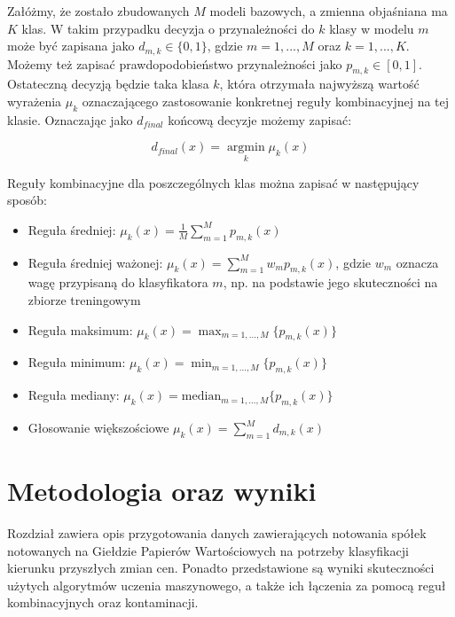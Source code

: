 \documentclass[12pt,a4paper,twoside,openany]{book}
\DeclareMathOperator*{\argmin}{argmin}
\newcommand*{\argminl}{\argmin\limits}
\begin{document}
Załóżmy, że zostało zbudowanych $M$ modeli bazowych, a zmienna objaśniana ma $K$ klas. W takim przypadku decyzja o przynależności do $k$ klasy w modelu $m$ może być zapisana jako $d_{m, k} \in \{0, 1\}$, gdzie $m = 1, ..., M$ oraz $k = 1, ..., K$. Możemy też zapisać prawdopodobieństwo przynależności jako $p_{m, k} \in {[0,1]}$. Ostateczną decyzją będzie taka klasa $k$, która otrzymała najwyższą wartość wyrażenia $\mu_k$ oznaczającego zastosowanie konkretnej reguły kombinacyjnej na tej klasie. Oznaczając jako $d_{final}$ końcową decyzje możemy zapisać:

\begin{equation} \label{wzor14}
d_{final}(x) = \argminl_{k}\mu_k(x)
\end{equation}

Reguły kombinacyjne dla poszczególnych klas można zapisać w następujący sposób:
\begin{itemize}
\item Reguła średniej: $\mu_k(x) = \frac{1}{M}\sum_{m = 1}^{M}p_{m, k}(x)$
\item Reguła średniej ważonej: $\mu_k(x) = \sum_{m = 1}^{M}w_mp_{m, k}(x)$, gdzie $w_m$ oznacza wagę przypisaną do klasyfikatora $m$, np. na podstawie jego skuteczności na zbiorze treningowym
\item Reguła maksimum: $\mu_k(x) = \max_{m = 1, ..., M}\{p_{m, k}(x)\}$
\item Reguła minimum: $\mu_k(x) = \min_{m = 1, ..., M}\{p_{m, k}(x)\}$
\item Reguła mediany: $\mu_k(x) = \mathrm{median}_{m = 1, ..., M}\{p_{m, k}(x)\}$
\item Głosowanie większościowe $\mu_k(x) = \sum_{m = 1}^{M} d_{m, k}(x)$
\end{itemize}

\chapter{Metodologia oraz wyniki}

Rozdział zawiera opis przygotowania danych zawierających notowania spółek notowanych na Giełdzie Papierów Wartościowych na potrzeby klasyfikacji kierunku przyszłych zmian cen. Ponadto przedstawione są wyniki skuteczności użytych algorytmów uczenia maszynowego, a także ich łączenia za pomocą reguł kombinacyjnych oraz kontaminacji.
\end{document}
